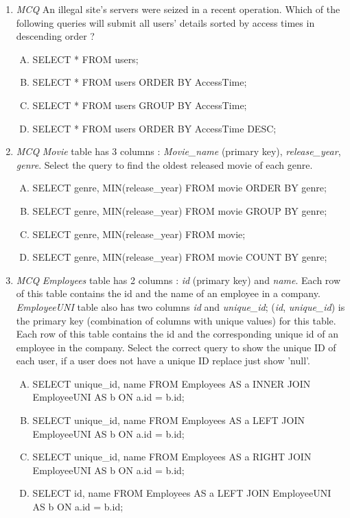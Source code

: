 \documentclass[11pt, a4paper]{article}
\begin{document}
\begin{enumerate}[1.]
\item \textit{MCQ} An illegal site's servers were seized in a recent operation. Which of the following queries will submit all users' details sorted by access times in descending order ?
	\begin{enumerate}[(A)]
		\item SELECT * FROM users;
		\item SELECT * FROM users ORDER BY AccessTime;
		\item SELECT * FROM users GROUP BY AccessTime;
		\item SELECT * FROM users ORDER BY AccessTime DESC;	
	\end{enumerate}
	
	
\item \textit{MCQ} \textit{Movie} table has 3 columns : \textit{Movie\_name} (primary key), \textit{release\_year}, \textit{genre}. Select the query to find the oldest released movie of each genre.
	\begin{enumerate}[(A)]
		\item SELECT genre, MIN(release\_year) FROM movie ORDER BY genre;
		\item SELECT genre, MIN(release\_year) FROM movie GROUP BY genre;
		\item SELECT genre, MIN(release\_year) FROM movie;
		\item SELECT genre, MIN(release\_year) FROM movie COUNT BY genre;	
	\end{enumerate}
	
	
\item \textit{MCQ} \textit{Employees} table has 2 columns : \textit{id} (primary key) and \textit{name}. Each row of this table contains the id and the name of an employee in a company. \textit{EmployeeUNI} table also has two columns \textit{id} and \textit{unique\_id}; (\textit{id}, \textit{unique\_id}) is the primary key (combination of columns with unique values) for this table. Each row of this table contains the id and the corresponding unique id of an employee in the company. Select the correct query to show the unique ID of each user, if a user does not have a unique ID replace just show 'null'.
	\begin{enumerate}[(A)]
		\item SELECT unique\_id, name FROM Employees AS a INNER JOIN EmployeeUNI AS b ON a.id = b.id;
		\item SELECT unique\_id, name FROM Employees AS a LEFT JOIN EmployeeUNI AS b ON a.id = b.id;
		\item SELECT unique\_id, name FROM Employees AS a RIGHT JOIN EmployeeUNI AS b ON a.id = b.id;
		\item SELECT id, name FROM Employees AS a LEFT JOIN EmployeeUNI AS b ON a.id = b.id;	
	\end{enumerate}
	

\end{enumerate}
\end{document}
